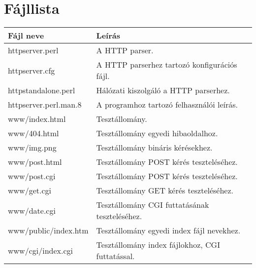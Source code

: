 \documentclass[12pt,a4paper]{article}
\begin{document}
\section{Fájllista}
\begin{table}[h]
\centering
\begin{tabular}{ll}
\hline
Fájl neve               & Leírás \\
\hline
\noindent
httpserver.perl & A HTTP parser.\\
httpserver.cfg & A HTTP parserhez tartozó konfigurációs fájl. \\
httpstandalone.perl & Hálózati kiszolgáló a HTTP parserhez.\\
httpserver.perl.man.8 & A programhoz tartozó felhasználói leírás. \\
www/index.html & Tesztállomány. \\
www/404.html & Tesztállomány egyedi hibaoldalhoz. \\
www/img.png & Tesztállomány bináris kérésekhez. \\
www/post.html & Tesztállomány POST kérés teszteléséhez. \\
www/post.cgi & Tesztállomány POST kérés teszteléséhez. \\
www/get.cgi & Tesztállomány GET kérés teszteléséhez. \\
www/date.cgi & Tesztállomány CGI futtatásának teszteléséhez. \\
www/public/index.htm & Tesztállomány egyedi index fájl nevekhez. \\
www/cgi/index.cgi & Tesztállomány index fájlokhoz, CGI futtatással.\\
\hline
\end{tabular}
\end{table}

\newpage
\tableofcontents
\end{document}
